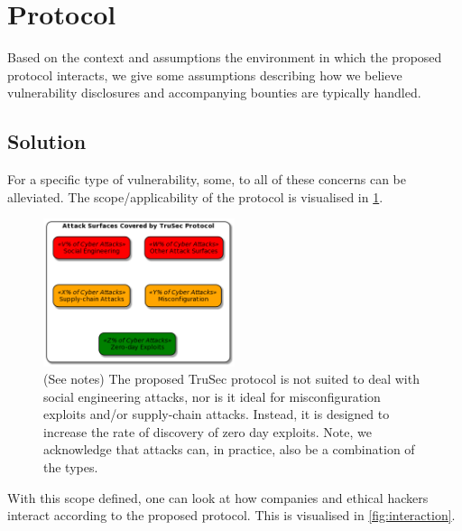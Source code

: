 \section{Protocol}
\label{sec:protocol}
Based on the context and assumptions  the environment in which the proposed protocol interacts, we give some assumptions describing how we believe vulnerability disclosures and accompanying bounties are typically handled.

\subsection{Solution}
For a specific type of vulnerability, some, to all of these concerns can be alleviated. The scope/applicability of the protocol is visualised in \cref{fig:protocol_scope}.
\begin{figure}[H]
    \centering
    \includegraphics[width=0.50\textwidth]{images/plantuml/scope.png}
    \caption{(See notes) The proposed TruSec protocol is not suited to deal with social engineering attacks, nor is it ideal for misconfiguration exploits and/or supply-chain attacks. Instead, it is designed to increase the rate of discovery of zero day exploits. Note, we acknowledge that attacks can, in practice, also be a combination of the types.}
    \label{fig:protocol_scope}
\end{figure}

\noindent With this scope defined, one can look at how companies and ethical hackers interact according to the proposed protocol. This is visualised in \cref{fig:interaction}.

